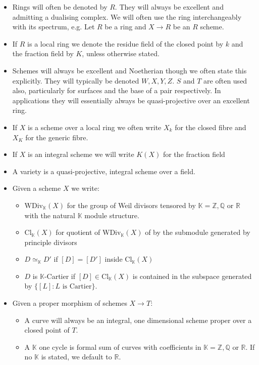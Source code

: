 \documentclass[a4paper,12pt]{book}
\begin{document}
	\begin{itemize}
		\item Rings will often be denoted by $R$. They will always be excellent and admitting a dualising complex. We will often use the ring interchangeably with its spectrum, e.g. Let $R$ be a ring and $X \to R$ be an $R$ scheme.
		\item If $R$ is a local ring we denote the residue field of the closed point by $k$ and the fraction field by $K$, unless otherwise stated.
		\item Schemes will always be excellent and Noetherian though we often state this explicitly. They will typically be denoted $W,X,Y,Z$. $S$ and $T$ are often used also, particularly for surfaces and the base of a pair respectively. In applications they will essentially always be quasi-projective over an excellent ring.
		\item If $X$ is a scheme over a local ring we often write $X_{k}$ for the closed fibre and $X_{K}$ for the generic fibre.
		\item If $X$ is an integral scheme we will write $K(X)$ for the fraction field
		\item A variety is a quasi-projective, integral scheme over a field.
		\item Given a scheme $X$ we write:
		\begin{itemize}
			\item $\text{WDiv}_{\mathbb{K}}(X)$ for the group of Weil divisors tensored by $\mathbb{K}=\mathbb{Z},\mathbb{Q}$ or $\mathbb{R}$ with the natural $\mathbb{K}$ module structure.
			\item $\text{Cl}_{\mathbb{K}}(X)$ for quotient of $\text{WDiv}_{\mathbb{K}}(X)$ of by the submodule generated by principle divisors
			\item $D \simeq_{\mathbb{K}}D'$ if $[D] = [D']$ inside $\text{Cl}_{\mathbb{K}}(X)$
			\item $D$ is $\mathbb{K}$-Cartier if $[D] \in \text{Cl}_{\mathbb{K}}(X)$ is contained in the subspace generated by $\{[L] \colon L \text{ is Cartier}\}$.
		\end{itemize}
		\item Given a proper morphism of schemes $X \to T$:
		\begin{itemize}
			\item A curve will always be an integral, one dimensional scheme proper over a closed point of $T$.
			\item A $\mathbb{K}$ one cycle is formal sum of curves with coefficients in $\mathbb{K}=\mathbb{Z},\mathbb{Q}$ or $\mathbb{R}$. If no $\mathbb{K}$ is stated, we default to $\mathbb{R}$.

\end{itemize}
\end{itemize}
\end{document}
